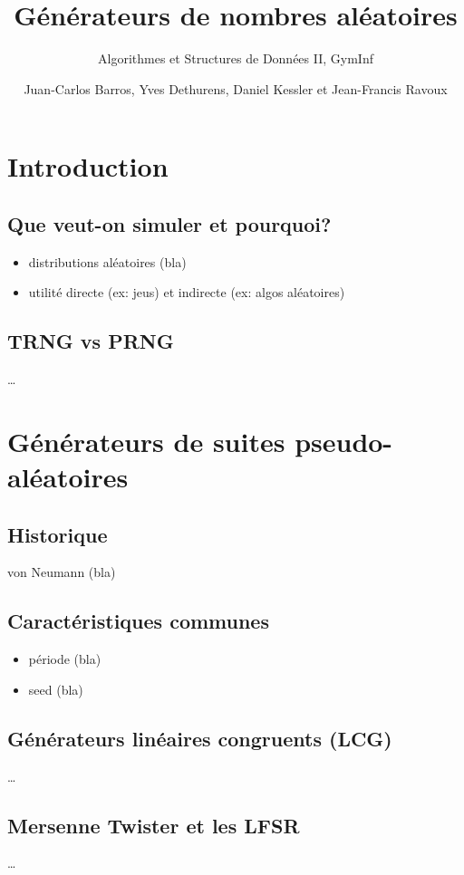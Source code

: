 \documentclass{scrartcl}
\title{Générateurs de nombres aléatoires}
\subtitle{Algorithmes et Structures de Données II, GymInf}
\author{Juan-Carlos Barros, Yves Dethurens, Daniel Kessler et Jean-Francis Ravoux}
\begin{document}
\maketitle

\tableofcontents

\section{Introduction}
\subsection{Que veut-on simuler et pourquoi?}
\begin{itemize}
\item distributions aléatoires (bla)
\item utilité directe (ex: jeus) et indirecte (ex: algos aléatoires)
\end{itemize}

\subsection{TRNG vs PRNG}
\ldots

\section{Générateurs de suites pseudo-aléatoires}
\subsection{Historique}
von Neumann (bla)

\subsection{Caractéristiques communes}
\begin{itemize}
\item période (bla)
\item seed (bla)
\end{itemize}

\subsection{Générateurs linéaires congruents (LCG)}
\ldots

\subsection{Mersenne Twister et les LFSR}
\ldots
\end{document}
